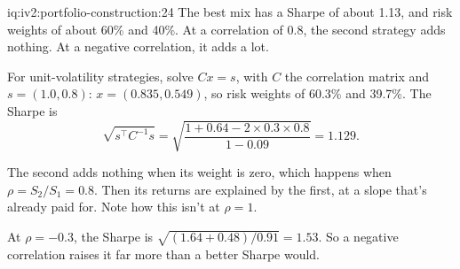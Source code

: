 \begin{solution}{iq:iv2:portfolio-construction:24}
The best mix has a Sharpe of about 1.13, and risk weights of about 60\% and 40\%. At a correlation of 0.8, the second strategy adds nothing. At a negative correlation, it adds a lot.

For unit-volatility strategies, solve $Cx = s$, with $C$ the correlation matrix and $s = (1.0, 0.8)$: $x = (0.835, 0.549)$, so risk weights of 60.3\% and 39.7\%. The Sharpe is
\[
\sqrt{s^\top C^{-1}s} = \sqrt{\frac{1 + 0.64 - 2 \times 0.3 \times 0.8}{1 - 0.09}} = 1.129.
\]

The second adds nothing when its weight is zero, which happens when $\rho = S_2/S_1 = 0.8$. Then its returns are explained by the first, at a slope that's already paid for. Note how this isn't at $\rho = 1$.

At $\rho = -0.3$, the Sharpe is $\sqrt{(1.64 + 0.48)/0.91} = 1.53$. So a negative correlation raises it far more than a better Sharpe would.

\end{solution}

